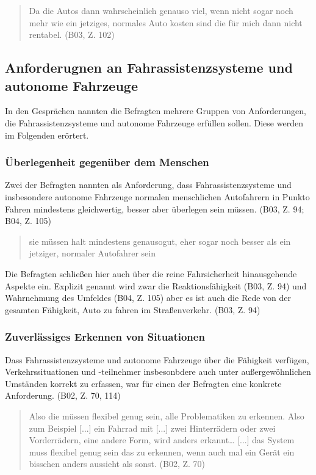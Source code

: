 \documentclass[12pt]{article}
\begin{document}
\begin{quote}
  Da die Autos dann wahrscheinlich genauso viel, wenn nicht sogar noch mehr wie ein jetziges, normales Auto kosten sind die für mich dann nicht rentabel. (B03, Z. 102)
\end{quote}


\subsection{Anforderugnen an Fahrassistenzsysteme und autonome Fahrzeuge}
In den Gesprächen nannten die Befragten mehrere Gruppen von Anforderungen, die Fahrassistenzsysteme und autonome Fahrzeuge erfüllen sollen. Diese werden im Folgenden erörtert.

\subsubsection*{Überlegenheit gegenüber dem Menschen}
Zwei der Befragten nannten als Anforderung, dass Fahrassistenzsysteme und insbesondere autonome Fahrzeuge normalen menschlichen Autofahrern in Punkto Fahren mindestens gleichwertig, besser aber überlegen sein müssen. (B03, Z. 94; B04, Z. 105)

\begin{quote}
  sie müssen halt mindestens genausogut, eher sogar noch besser als ein jetziger, normaler Autofahrer sein
\end{quote}

Die Befragten schließen hier auch über die reine Fahrsicherheit hinausgehende Aspekte ein. Explizit genannt wird zwar die Reaktionsfähigkeit (B03, Z. 94) und Wahrnehmung des Umfeldes (B04, Z. 105) aber es ist auch die Rede von \glqq der gesamten Fähigkeit, Auto zu fahren im Straßenverkehr\grqq{}. (B03, Z. 94)

\subsubsection*{Zuverlässiges Erkennen von Situationen}
Dass Fahrassistenzsysteme und autonome Fahrzeuge über die Fähigkeit verfügen, Verkehrssituationen und -teilnehmer insbesonbdere auch unter außergewöhnlichen Umständen korrekt zu erfassen, war für einen der Befragten eine konkrete Anforderung. (B02, Z. 70, 114)

\begin{quote}
  Also die müssen flexibel genug sein, alle Problematiken zu erkennen. Also zum Beispiel [...] ein Fahrrad mit [...] zwei Hinterrädern oder zwei Vorderrädern, eine andere Form, wird anders erkannt… [...] das System muss flexibel genug sein das zu erkennen, wenn auch mal ein Gerät ein bisschen anders aussieht als sonst. (B02, Z. 70)
\end{quote}
\end{document}
